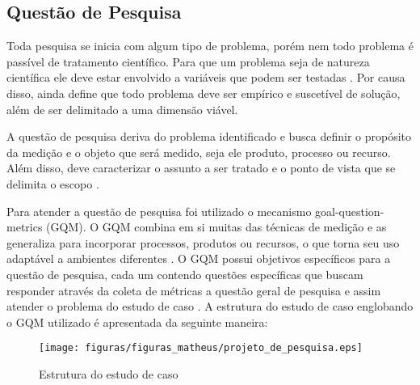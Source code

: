 \textcolor{red}{}


\subsection{Questão de Pesquisa}

Toda pesquisa se inicia com algum tipo de problema, porém nem todo problema é passível de tratamento científico. Para que um problema seja de natureza científica ele deve estar envolvido a variáveis que podem ser testadas \cite{gil_como_2002}. Por causa disso,  ainda define que todo problema deve ser empírico e suscetível de solução, além de ser delimitado a uma dimensão viável.

A questão de pesquisa deriva do problema identificado e busca definir o propósito da medição e o objeto que será medido, seja ele produto, processo ou recurso. Além disso, deve caracterizar o assunto a ser tratado e o ponto de vista que se delimita o escopo \cite{Basili96b} \cite{caldiera_goal_1994}.

Para atender a questão de pesquisa foi utilizado o mecanismo goal-question-metrics (GQM). O GQM combina em si muitas das técnicas de medição e as generaliza para incorporar processos, produtos ou recursos, o que torna seu uso adaptável a ambientes diferentes \cite{caldiera_goal_1994}. O GQM possui objetivos específicos para a questão de pesquisa, cada um contendo questões específicas que buscam responder através da coleta de métricas a questão geral de pesquisa e assim atender o problema do estudo de caso \cite{Basili96b}. A estrutura do estudo de caso englobando o GQM utilizado é apresentada da seguinte maneira:  

\begin{figure}[h!]
\centering
\texttt{[image: figuras/figuras\_matheus/projeto\_de\_pesquisa.eps]}
\caption{Estrutura do estudo de caso}
\label{fig:pesquisa}
\end{figure}
\FloatBarrier

